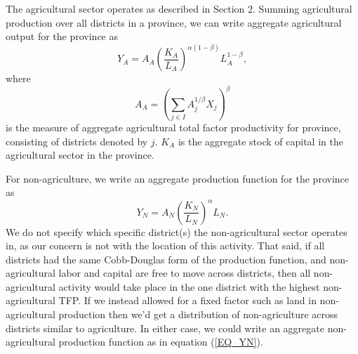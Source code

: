 \documentclass[11pt]{article}
\begin{document}
The agricultural sector operates as described in Section 2. Summing agricultural production over all districts in a province, we can write aggregate agricultural output for the province as
\begin{equation}
    Y_A = A_A \left(\frac{K_A}{L_A}\right)^{\alpha(1-\beta)} L_A^{1-\beta}, \label{EQ_caL_solve}
\end{equation}
where 
\begin{equation}
    A_A = \left(\sum_{j\in I} A_{j}^{1/\beta}X_{j} \right)^\beta \nonumber
\end{equation}
is the measure of aggregate agricultural total factor productivity for province, consisting of districts denoted by $j$. $K_A$ is the aggregate stock of capital in the agricultural sector in the province. 

For non-agriculture, we write an aggregate production function for the province as
\begin{equation}
    Y_N = A_N \left(\frac{K_N}{L_N}\right)^{\alpha} L_N. \label{EQ_YN}
\end{equation}
We do not specify which specific district(s) the non-agricultural sector operates in, as our concern is not with the location of this activity. That said, if all districts had the same Cobb-Douglas form of the production function, and non-agricultural labor and capital are free to move across districts, then all non-agricultural activity would take place in the one district with the highest non-agricultural TFP. If we instead allowed for a fixed factor such as land in non-agricultural production then we'd get a distribution of non-agriculture across districts similar to agriculture. In either case, we could write an aggregate non-agricultural production function as in equation (\ref{EQ_YN}).
\end{document}
